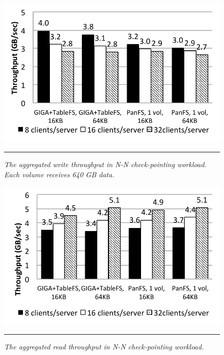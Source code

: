 \begin{figure}[t]  %
\centerline{\includegraphics[scale=0.6]{./figs/checkpointing_write}}
\vspace{10pt}
\caption{\normalsize
\textit{
The aggregated write throughput in N-N check-pointing workload.
Each volume receives 640 GB data.
}
}
\vspace{10pt}
\hrule
\label{graph:checkpoint_write}
\end{figure}       %

\begin{figure}[t]  %
\centerline{\includegraphics[scale=0.6]{./figs/checkpointing_read}}
\vspace{10pt}
\caption{\normalsize
\textit{
The aggregated read throughput in N-N check-pointing workload.
}
}
\vspace{10pt}
\hrule
\label{graph:checkpoint_read}
\end{figure}       %


